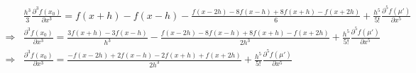 \documentclass[12pt,a4]{article}
\begin{document}
\begin{enumerate}
\begin{align*}
                  & \frac{h^3}{3} \frac{\partial^3 f(x_0)}{\partial x^3} = f(x + h) - f(x - h) - \frac{f(x - 2 h)- 8 f(x - h) + 8 f(x + h) - f(x + 2 h)}{6} + \frac{h^5}{5!} \frac{\partial^5 f(\mu')}{\partial x^5}\\
      \Rightarrow & \frac{\partial^3 f(x_0)}{\partial x^3} = \frac{3 f(x + h) - 3 f(x - h)}{h^3} - \frac{f(x - 2 h)- 8 f(x - h) + 8 f(x + h) - f(x + 2 h)}{2 h^3} + \frac{h^5}{5!} \frac{\partial^5 f(\mu')}{\partial x^5}\\
      \Rightarrow & \frac{\partial^3 f(x_0)}{\partial x^3} = \frac{- f(x - 2 h) + 2 f(x - h) - 2 f(x + h) + f(x +  2 h)}{2 h^3} + \frac{h^5}{5!} \frac{\partial^5 f(\mu')}{\partial x^5} 
    \end{align*}
\end{enumerate}
\end{document}
